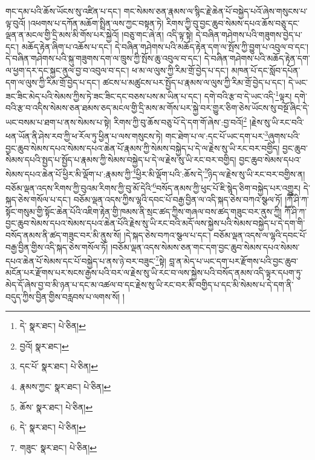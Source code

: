 གང་དམ་པའི་ཆོས་ཡོངས་སུ་འཛིན་པ་དང་། གང་སེམས་ཅན་རྣམས་ལ་སྙིང་རྗེ་ཆེན་པོ་བསྐྱེད་པའོ་ཞེས་གསུངས་པ་ལྟ་བུའོ། །འཕགས་པ་དཀོན་མཆོག་སྤྲིན་ལས་ཀྱང་བསྟན་ཏེ། རིགས་ཀྱི་བུ་བྱང་ཆུབ་སེམས་དཔའ་ཆོས་བཅུ་དང་ལྡན་ན་མངལ་གྱི་དྲི་མས་མི་གོས་པར་སྐྱེའོ། །བཅུ་གང་ཞེ་ན། འདི་ལྟ་སྟེ། དེ་བཞིན་གཤེགས་པའི་གཟུགས་བྱེད་པ་དང་། མཆོད་རྟེན་ཞིག་པ་འཆོས་པ་དང་། དེ་བཞིན་གཤེགས་པའི་མཆོད་རྟེན་དག་ལ་སྤོས་ཀྱི་བྱུག་པ་འབུལ་བ་དང་། དེ་བཞིན་གཤེགས་པའི་སྐུ་གཟུགས་དག་ལ་ཁྲུས་ཀྱི་སྤོས་ཆུ་འབུལ་བ་དང་། དེ་བཞིན་གཤེགས་པའི་མཆོད་རྟེན་དག་ལ་ཕྱག་དར་དང་སྐྱང་ནུལ་བྱ་བ་འབུལ་བ་དང་། ཕ་མ་ལ་ལུས་ཀྱི་རིམ་གྲོ་བྱེད་པ་དང་། མཁན་པོ་དང་སློབ་དཔོན་དག་ལ་ལུས་ཀྱི་རིམ་གྲོ་བྱེད་པ་དང་། ཚངས་པ་མཚུངས་པར་སྤྱོད་པ་རྣམས་ལ་ལུས་ཀྱི་རིམ་གྲོ་བྱེད་པ་དང་། དེ་ཡང་ཟང་ཟིང་མེད་པའི་སེམས་ཀྱིས་ཏེ་ཟང་ཟིང་དང་བཅས་པས་མ་ཡིན་པ་དང་། དགེ་བའི་རྩ་བ་དེ་ཡང་འདི་\footnote{དེ་  སྣར་ཐང་།  པེ་ཅིན། }ལྟར། དགེ་བའི་རྩ་བ་འདིས་སེམས་ཅན་ཐམས་ཅད་མངལ་གྱི་དྲི་མས་མ་གོས་པར་སྐྱེ་བར་གྱུར་ཅིག་ཅེས་ཡོངས་སུ་བསྔོ་ཞིང་དེ་ཡང་བསམ་པ་ཐག་པ་ནས་སེམས་པ་སྟེ། རིགས་ཀྱི་བུ་ཆོས་བཅུ་པོ་དེ་དག་གོ་ཞེས་:བྱ་བའོ།\footnote{བྱའོ།  སྣར་ཐང་། } །རྗེས་སུ་ཡི་རང་བའི་ཕན་ཡོན་ནི་ཤེས་རབ་ཀྱི་ཕ་རོལ་ཏུ་ཕྱིན་པ་ལས་གསུངས་ཏེ། གང་ཐེག་པ་ལ་:དང་པོ་ཡང་དག་པར་\footnote{དང་པོ་  སྣར་ཐང་།  པེ་ཅིན། }ཞུགས་པའི་བྱང་ཆུབ་སེམས་དཔའ་སེམས་དཔའ་ཆེན་པོ་རྣམས་ཀྱི་སེམས་བསྐྱེད་པ་དེ་ལ་རྗེས་སུ་ཡི་རང་བར་བགྱིད། བྱང་ཆུབ་སེམས་དཔའི་སྤྱད་པ་སྤྱོད་པ་རྣམས་ཀྱི་སེམས་བསྐྱེད་པ་དེ་ལ་རྗེས་སུ་ཡི་རང་བར་བགྱིད། བྱང་ཆུབ་སེམས་དཔའ་སེམས་དཔའ་ཆེན་པོ་ཕྱིར་མི་ལྡོག་པ་:རྣམས་ཀྱི་\footnote{རྣམས་ཀྱང་  སྣར་ཐང་།  པེ་ཅིན། }ཕྱིར་མི་ལྡོག་པའི་:ཆོས་དེ་\footnote{ཆོས་  སྣར་ཐང་།  པེ་ཅིན། }ཉིད་ལ་རྗེས་སུ་ཡི་རང་བར་བགྱིས་ན། བཅོམ་ལྡན་འདས་རིགས་ཀྱི་བུའམ་རིགས་ཀྱི་བུ་མོ་དེའི་\footnote{དེ་  སྣར་ཐང་།  པེ་ཅིན། }བསོད་ནམས་ཀྱི་ཕུང་པོ་ཇི་སྙེད་ཅིག་བསྐྱེད་པར་འགྱུར། དེ་སྐད་ཅེས་གསོལ་པ་དང་། བཅོམ་ལྡན་འདས་ཀྱིས་ལྷའི་དབང་པོ་བརྒྱ་བྱིན་ལ་འདི་སྐད་ཅེས་བཀའ་སྩལ་ཏོ། །ཀཽ་ཤི་ཀ་སྟོང་གསུམ་གྱི་སྟོང་ཆེན་པོའི་འཇིག་རྟེན་གྱི་ཁམས་ནི་སྲང་ཚད་ཀྱིས་གཞལ་བས་ཚད་གཟུང་བར་ནུས་ཀྱི། ཀཽ་ཤི་ཀ་བྱང་ཆུབ་སེམས་དཔའ་སེམས་དཔའ་ཆེན་པོའི་རྗེས་སུ་ཡི་རང་བའི་མདོ་ལས་སྐྱེས་པའི་སེམས་བསྐྱེད་པ་དེ་དག་གི་བསོད་ནམས་ནི་ཚད་གཟུང་བར་མི་ནུས་སོ། །དེ་སྐད་ཅེས་བཀའ་སྩལ་པ་དང་། བཅོམ་ལྡན་འདས་ལ་ལྷའི་དབང་པོ་བརྒྱ་བྱིན་གྱིས་འདི་སྐད་ཅེས་གསོལ་ཏོ། །བཅོམ་ལྡན་འདས་སེམས་ཅན་གང་དག་བྱང་ཆུབ་སེམས་དཔའ་སེམས་དཔའ་ཆེན་པོ་སེམས་དང་པོ་བསྐྱེད་པ་ནས་ཉེ་བར་བཟུང་\footnote{གཟུང་  སྣར་ཐང་།  པེ་ཅིན། }སྟེ། བླ་ན་མེད་པ་ཡང་དག་པར་རྫོགས་པའི་བྱང་ཆུབ་མངོན་པར་རྫོགས་པར་སངས་རྒྱས་པའི་བར་ལ་རྗེས་སུ་ཡི་རང་བ་ལས་སྐྱེས་པའི་བསོད་ནམས་འདི་ལྟར་དཔག་ཏུ་མེད་དོ་ཞེས་བྱ་བ་མི་ཉན་པ་དང་མ་འཚལ་བ་དང་རྗེས་སུ་ཡི་རང་བར་མི་བགྱིད་པ་དང་མི་སེམས་པ་དེ་དག་ནི་བདུད་ཀྱིས་བྱིན་གྱིས་བརླབས་པ་ལགས་སོ། །
